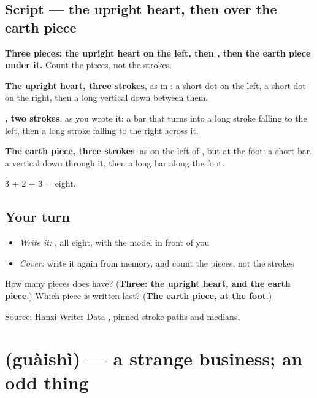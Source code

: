\subsection*{Script — the upright heart, then  over the earth piece}

\begin{quote}
\end{quote}

\textbf{Three pieces: the upright heart on the left, then , then the earth piece under it.} Count the pieces, not the strokes.

\textbf{The upright heart, three strokes}, as in : a short dot on the left, a short dot on the right, then a long vertical down between them.

\textbf{, two strokes}, as you wrote it: a bar that turns into a long stroke falling to the left, then a long stroke falling to the right across it.

\textbf{The earth piece, three strokes}, as on the left of , but at the foot: a short bar, a vertical down through it, then a long bar along the foot.

3 + 2 + 3 = eight.

\subsection*{Your turn}
\begin{itemize}
\raggedright
  \item \emph{Write it:} , all eight, with the model in front of you
  \item \emph{Cover:} write it again from memory, and count the pieces, not the strokes
\end{itemize}

\begin{tcolorbox}[breakable,colback=teal!4,colframe=teal!35!black,title={Before you move on}]
How many pieces does  have? (\textbf{Three: the upright heart,  and the earth piece}.) Which piece is written last? (\textbf{The earth piece, at the foot}.)

Source: \href{https://raw.githubusercontent.com/chanind/hanzi-writer-data/68d10a4b21150cae5e1ebbd223eed289cf32d90c/data/\%E6\%80\%AA.json}{Hanzi Writer Data , pinned stroke paths and medians}.
\end{tcolorbox}
\section[\texorpdfstring{\zh{怪事} (guàishì)}{怪事 (guàishì)}]{ (guàishì) — a strange business; an odd thing}

